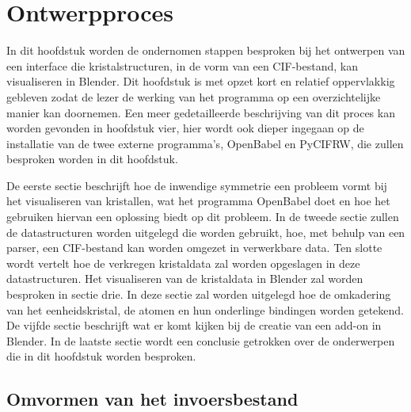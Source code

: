 

\chapter{Ontwerpproces}

In dit hoofdstuk worden de ondernomen stappen besproken bij het ontwerpen van een interface die kristalstructuren, in de vorm van een CIF-bestand, kan visualiseren in Blender. Dit hoofdstuk is met opzet kort en relatief oppervlakkig gebleven zodat de lezer de werking van het programma op een overzichtelijke manier kan doornemen. Een meer gedetailleerde beschrijving van dit proces kan worden gevonden in hoofdstuk vier, hier wordt ook dieper ingegaan op de installatie van de twee externe programma's, OpenBabel en PyCIFRW, die zullen besproken worden in dit hoofdstuk.
\par
De eerste sectie beschrijft hoe de inwendige symmetrie een probleem vormt bij het visualiseren van kristallen, wat het programma OpenBabel doet en hoe het gebruiken hiervan een oplossing biedt op dit probleem.
In de tweede sectie zullen de datastructuren worden uitgelegd die worden gebruikt, hoe, met behulp van een parser, een CIF-bestand kan worden omgezet in verwerkbare data. Ten slotte wordt vertelt hoe de verkregen kristaldata zal worden opgeslagen in deze datastructuren.
Het visualiseren van de kristaldata in Blender zal worden besproken in sectie drie. In deze sectie zal worden uitgelegd hoe de omkadering van het eenheidskristal, de atomen en hun onderlinge bindingen worden getekend.
De vijfde sectie beschrijft wat er komt kijken bij de creatie van een add-on in Blender. 
In de laatste sectie wordt een conclusie getrokken over de onderwerpen die in dit hoofdstuk worden besproken.


\section{Omvormen van het invoersbestand}


